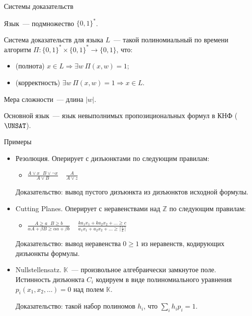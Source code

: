 \begin{frame}{Системы доказательств}

	Язык~--- подмножество $\{0, 1\}^*$.

    \begin{definition}
        Система доказательств для языка $L$~--- такой полиномиальный по времени алгоритм $\Pi: \{0,
        1\}^* \times \{0, 1\}^* \rightarrow \{0, 1\}$, что:
        \begin{itemize}
            \item (полнота) $x \in L \Rightarrow \exists w ~ \Pi(x, w) = 1$;
            \item (корректность) $\exists w ~ \Pi(x, w) = 1 \Rightarrow x \in L$.
        \end{itemize}
    \end{definition}

    \pause

    Мера сложности~--- длина $|w|$.

    \pause

    Основной язык~--- язык невыполнимых пропозициональных формул в КНФ ($\UNSAT$).

\end{frame}


\begin{frame}{Примеры}

    \begin{itemize}
        \item Резолюция.
            \pause
            Оперирует с дизъюнктами по следующим правилам:
            \begin{itemize}
                \item $\frac{A \lor x ~~~ B \lor \neg x}{A \lor B} ~~~~~ \frac{A}{A \lor z}$
            \end{itemize}
            Доказательство: вывод пустого дизъюнкта из дизъюнктов исходной формулы.
        \pause
        \item Cutting Planes.
            \pause
            Оперирует с неравенствами над $\mathbb{Z}$ по следующим правилам:
            \begin{itemize}
                \item $\frac{A \ge a ~~~ B \ge b}{\alpha A + \beta B \ge \alpha a + \beta b} ~~~~~ \frac{ka_1 x_1 + ka_2 x_2
                    + \dots \ge c}{a_1 x_1 + a_2 x_2 + \dots \ge \lceil \frac{c}{k} \rceil}$
            \end{itemize}
            Доказательство: вывод неравенства $0 \ge 1$ из неравенств, кодирующих дизъюнкты формулы.
        \pause
        \item Nullstellensatz.
            \pause
            $\mathbb{K}$~--- произвольное алгебраически замкнутое поле. Истинность дизъюнкта $C_i$ кодируем в виде
            полиномиального уравнения $p_i(x_1, x_2, \dots) = 0$ над полем $\mathbb{K}$.
            \pause
            
            Доказательство: такой набор полиномов $h_i$, что $\sum\limits_{i} h_i p_i = 1$.
    \end{itemize}

\end{frame}


